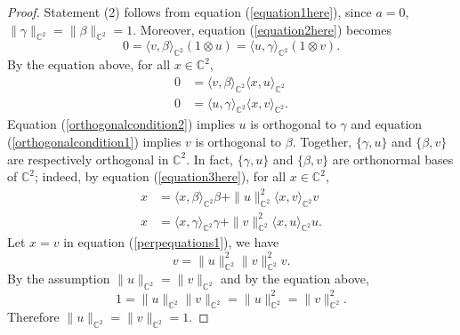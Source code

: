 \documentclass[12pt,reqno]{amsart}
\numberwithin{equation}{section}
\theoremstyle{definition}
\begin{document}
\begin{proof}
Statement (2) follows from equation (\ref{equation1here}), since $a=0$, $\|\gamma\|_{\mathbb{C}^{2}}=\|\beta\|_{\mathbb{C}^{2}}=1$. Moreover, equation (\ref{equation2here}) becomes
$$0 = \langle v,\beta\rangle_{\mathbb{C}^{2}}(1\otimes u) = \langle u,\gamma\rangle_{\mathbb{C}^{2}}(1\otimes v). $$
By the equation above, for all $x\in\mathbb{C}^{2}$,
\begin{align}
    0 &= \langle v,\beta\rangle_{\mathbb{C}^{2}}\langle x,u\rangle_{\mathbb{C}^{2}} \label{orthogonalcondition1} \\
    0 &= \langle u,\gamma\rangle_{\mathbb{C}^{2}}\langle x,v\rangle_{\mathbb{C}^{2}}\label{orthogonalcondition2}.
\end{align}
Equation (\ref{orthogonalcondition2}) implies $u$ is orthogonal to $\gamma$ and equation (\ref{orthogonalcondition1}) implies $v$ is orthogonal to $\beta$. Together, $\{\gamma,u\}$ and $\{\beta,v\}$ are respectively orthogonal in $\mathbb{C}^{2}$. In fact, $\{\gamma,u\}$ and $\{\beta,v\}$ are orthonormal bases of $\mathbb{C}^{2}$; indeed, by equation (\ref{equation3here}), for all $x\in\mathbb{C}^{2}$,
\begin{align}
x &= \langle x,\beta\rangle_{\mathbb{C}^{2}}\beta + \|u\|_{\mathbb{C}^{2}}^{2}\langle x,v \rangle_{\mathbb{C}^{2}} v\label{perpequations1}\\
x &= \langle x,\gamma\rangle_{\mathbb{C}^{2}}\gamma + \|v\|_{\mathbb{C}^{2}}^{2}\langle x,u\rangle_{\mathbb{C}^{2}}u.\label{perpequations2}  
\end{align}
Let $x=v$ in equation (\ref{perpequations1}), we have 
$$v=\|u\|_{\mathbb{C}^{2}}^{2}\|v\|^{2}_{\mathbb{C}^{2}}v.$$
By the assumption $\|u\|_{\mathbb{C}^{2}}=\|v\|_{\mathbb{C}^{2}}$ and by the equation above,
$$1=\|u\|_{\mathbb{C}^{2}}\|v\|_{\mathbb{C}^{2}} = \|u\|_{\mathbb{C}^{2}}^{2}=\|v\|_{\mathbb{C}^{2}}^{2}.$$
Therefore $\|u\|_{\mathbb{C}^{2}}=\|v\|_{\mathbb{C}^{2}}=1$.



\end{proof}
\end{document}
